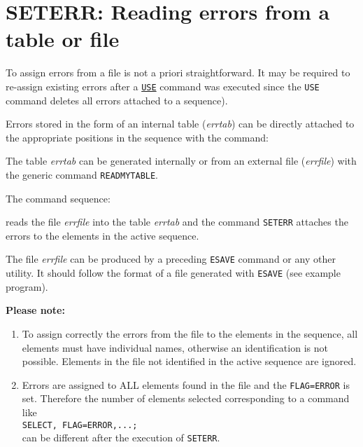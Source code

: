 \section{SETERR: Reading errors from a table or file}
\label{sec:seterr}

To assign errors from a file is not a priori straightforward. It may be
required to re-assign existing errors after a \hyperref[sec:use]{\tt USE}
command was executed since the {\tt USE} command deletes all errors attached to 
a sequence).

Errors stored in the form of an internal table ({\it errtab}) can  be
directly attached to the appropriate positions in the sequence with the
command:  


The table {\it errtab} can be generated internally or from an
external file ({\it errfile}) with the generic command {\tt READMYTABLE}.  
 

The command sequence: 

reads the file {\it errfile} into the table {\it errtab} and the
command {\tt SETERR} attaches the errors to the elements in the active
sequence.  

The file {\it errfile} can be produced by a preceding {\tt ESAVE} command
or any other utility. It should follow the format of a file generated
with {\tt ESAVE} (see example program). 

{\bf Please note:}
\begin{enumerate}
   \item To assign correctly the errors from the file to the elements in
     the sequence, all elements must have individual names, otherwise an
     identification is not possible. Elements in the file not identified
     in the active sequence are ignored.  
   \item Errors are assigned to ALL elements found in the file and the
     {\tt FLAG=ERROR} is set. Therefore the number of elements selected
     corresponding to a command like
     \\ {\tt SELECT, FLAG=ERROR,...;}
     \\ can be different after the execution of {\tt SETERR}. 
\end{enumerate}


